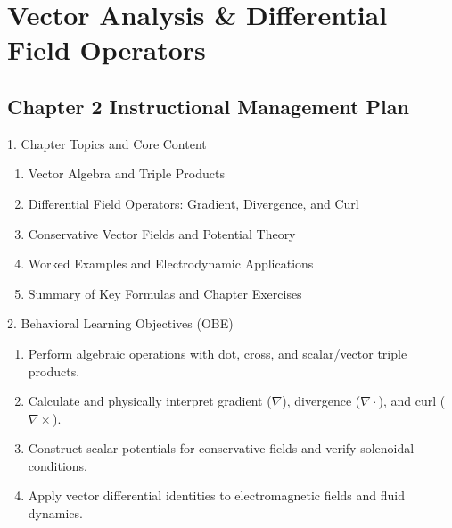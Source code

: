 \chapter{Vector Analysis \& Differential Field Operators}

\section*{Chapter 2 Instructional Management Plan}

\begin{planbox}[colframe=rbruNavy, colbacktitle=rbruNavy]{1. Chapter Topics and Core Content}
\begin{enumerate}[topsep=2pt, itemsep=1pt, partopsep=0pt, parsep=0pt, leftmargin=1.5em]
    \item Vector Algebra and Triple Products
    \item Differential Field Operators: Gradient, Divergence, and Curl
    \item Conservative Vector Fields and Potential Theory
    \item Worked Examples and Electrodynamic Applications
    \item Summary of Key Formulas and Chapter Exercises
\end{enumerate}
\end{planbox}

\begin{planbox}[colframe=rbruGreen, colbacktitle=rbruGreen]{2. Behavioral Learning Objectives (OBE)}
\begin{enumerate}[topsep=2pt, itemsep=1pt, partopsep=0pt, parsep=0pt, leftmargin=1.5em]
    \item Perform algebraic operations with dot, cross, and scalar/vector triple products.
    \item Calculate and physically interpret gradient ($\nabla$), divergence ($\nabla \cdot$), and curl ($\nabla \times$).
    \item Construct scalar potentials for conservative fields and verify solenoidal conditions.
    \item Apply vector differential identities to electromagnetic fields and fluid dynamics.
\end{enumerate}
\end{planbox}

